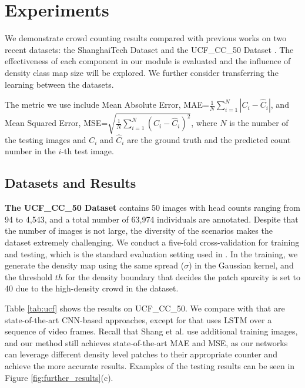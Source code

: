 \documentclass[journal]{IEEEtran}
\begin{document}
\section{Experiments}
\label{sec:exp}

We demonstrate crowd counting results compared with previous works on two recent datasets: the ShanghaiTech Dataset \cite{Zhang:2016fr} and the UCF\_CC\_50 Dataset \cite{idrees2013multi}. The effectiveness of each component in our module is evaluated and the influence of density class map size will be explored. We further consider transferring the learning between the datasets.

The metric we use include Mean Absolute Error, MAE=$\frac{1}{N} \sum_{i=1}^{N} | C_i - \widehat C_i |$, and Mean Squared Error, MSE=$\sqrt{\frac{1}{N}  \sum_{i=1}^{N} ( C_i - \widehat C_i )^2}$, where $N$ is the number of the testing images and $C_i$ and $\widehat C_i$ are the ground truth and the predicted count number in the $i$-th test image.

\subsection{Datasets and Results}

\noindent \textbf{The UCF\_CC\_50 Dataset} \cite{idrees2013multi} contains 50 images with head counts ranging from 94 to 4,543, and a total number of 63,974 individuals are annotated. Despite that the number of images is not large, the diversity of the scenarios makes the dataset extremely challenging. We conduct a five-fold cross-validation for training and testing, which is the standard evaluation setting used in \cite{idrees2013multi}. In the training, we generate the density map using the same spread ($\sigma$) in the Gaussian kernel, and the threshold $th$ for the density boundary that decides the patch sparcity is set to 40 due to the high-density crowd in the dataset.

Table \ref{tab:ucf} shows the results on UCF\_CC\_50. We compare with \cite{Zhang:2015id, Zhang:2016fr, sam2017switching, Sindagi:2017vv, Shang:2016iq} that are state-of-the-art CNN-based approaches, except for \cite{Shang:2016iq} that uses LSTM over a sequence of video frames. Recall that Shang et al. \cite{Shang:2016iq} use additional training images, and our method still achieves state-of-the-art MAE and MSE, as our networks can leverage different density level patches to their appropriate counter and achieve the more accurate results. Examples of the testing results can be seen in Figure \ref{fig:further_results}(c).
\end{document}
